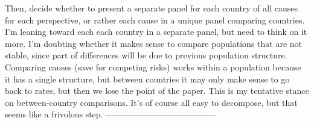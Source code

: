 \documentclass{article}
\begin{document}
Then, decide whether to present a separate panel for each country of all causes
for each perspective, or rather each cause in a unique panel comparing
countries. I'm leaning toward each each country in a separate panel, but need to
think on it more. I'm doubting whether it makes sense to compare populations
that are not stable, since part of differences will be due to previous
population structure. Comparing causes (save for competing risks) works within a
population because it has a single structure, but between countries it may only
make sense to go back to rates, but then we lose the point of the paper. This is
my tentative stance on between-country comparisons. It's of course all easy to
decompose, but that seems like a frivolous step.
%
---------------------------------------

    
\end{document}
